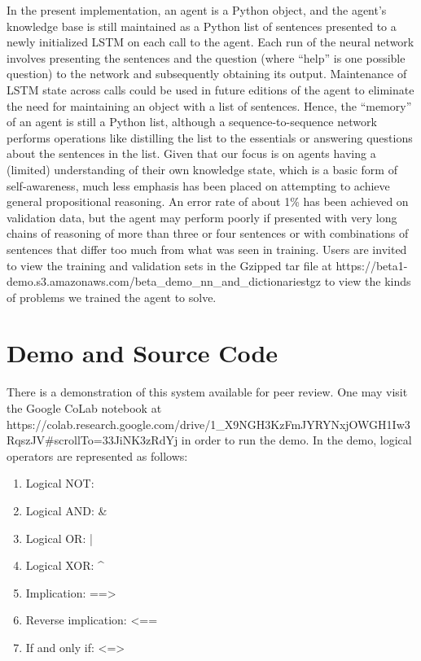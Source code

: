 \documentclass{article}
\begin{document}
In the present implementation, an agent is a Python object, and the agent’s knowledge base is still maintained as a Python list of sentences presented to a newly initialized LSTM on each call to the agent. Each run of the neural network involves presenting the sentences and the question (where “help” is one possible question) to the network and subsequently obtaining its output. Maintenance of LSTM state across calls could be used in future editions of the agent to eliminate the need for maintaining an object with a list of sentences. Hence, the “memory” of an agent is still a Python list, although a sequence-to-sequence network performs operations like distilling the list to the essentials or answering questions about the sentences in the list.
Given that our focus is on agents having a (limited) understanding of their own knowledge state, which is a basic form of self-awareness, much less emphasis has been placed on attempting to achieve general propositional reasoning. An error rate of about 1\% has been achieved on validation data, but the agent may perform poorly if presented with very long chains of reasoning of more than three or four sentences or with combinations of sentences that differ too much from what was seen in training. Users are invited to view the training and validation sets in the Gzipped tar file at https://beta1-demo.s3.amazonaws.com/beta\_demo\_nn\_and\_dictionaries\.tgz to view the kinds of problems we trained the agent to solve.

\section{Demo and Source Code}

There is a demonstration of this system available for peer review. One may visit the Google CoLab notebook at https://colab.research.google.com/drive/1\_X9NGH3KzFmJYRYNxjOWGH1Iw3RqszJV#scrollTo=33JiNK3zRdYj in order to run the demo.
In the demo, logical operators are represented as follows:

\begin{enumerate}
	\item Logical NOT: ~
	\item Logical AND: \&
	\item Logical OR: |
	\item Logical XOR: \^
	\item Implication: ==>
	\item Reverse implication: <==
	\item If and only if: <=>
\end{enumerate}
\end{document}
